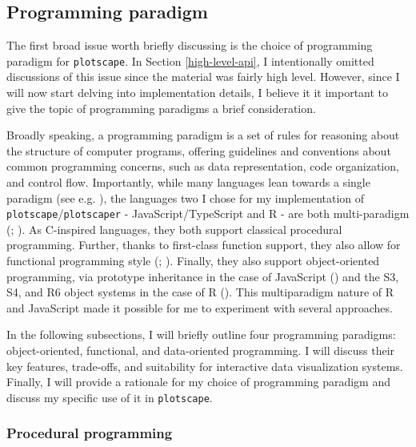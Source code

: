 \documentclass[
  openany]{book}
\theoremstyle{definition}
\theoremstyle{definition}
\theoremstyle{definition}
\theoremstyle{definition}
\theoremstyle{remark}
\begin{document}
\subsection{Programming paradigm}\label{programming-paradigm}

The first broad issue worth briefly discussing is the choice of programming paradigm for \texttt{plotscape}. In Section \ref{high-level-api}, I intentionally omitted discussions of this issue since the material was fairly high level. However, since I will now start delving into implementation details, I believe it it important to give the topic of programming paradigms a brief consideration.

Broadly speaking, a programming paradigm is a set of rules for reasoning about the structure of computer programs, offering guidelines and conventions about common programming concerns, such as data representation, code organization, and control flow. Importantly, while many languages lean towards a single paradigm (see e.g. ), the languages two I chose for my implementation of \texttt{plotscape}/\texttt{plotscaper} - JavaScript/TypeScript and R - are both multi-paradigm (; ). As C-inspired languages, they both support classical procedural programming. Further, thanks to first-class function support, they also allow for functional programming style (; ). Finally, they also support object-oriented programming, via prototype inheritance in the case of JavaScript () and the S3, S4, and R6 object systems in the case of R (). This multiparadigm nature of R and JavaScript made it possible for me to experiment with several approaches.

In the following subsections, I will briefly outline four programming paradigms: object-oriented, functional, and data-oriented programming. I will discuss their key features, trade-offs, and suitability for interactive data visualization systems. Finally, I will provide a rationale for my choice of programming paradigm and discuss my specific use of it in \texttt{plotscape}.

\subsubsection{Procedural programming}\label{procedural-programming}
\end{document}
